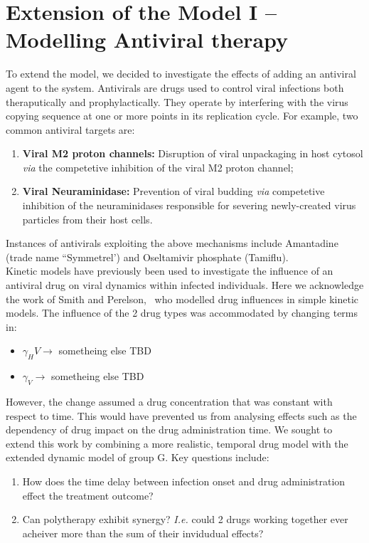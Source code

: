\documentclass[a4paper, 12pt]{report}
\begin{document}
\section{Extension of the Model I -- Modelling Antiviral therapy}

To extend the model, we decided to investigate the effects of adding an antiviral agent to the system.
Antivirals are drugs used to control viral infections both theraputically and prophylactically. They operate by interfering with the virus copying sequence at one or more points in its replication cycle. For example, two common antiviral targets are:
\begin{enumerate}
\item \textbf{Viral M2 proton channels:} Disruption of viral unpackaging in host cytosol \textit{via} the competetive inhibition of the viral M2 proton channel;~\cite{}
\item \textbf{Viral Neuraminidase:} Prevention of viral budding \textit{via} competetive inhibition of the neuraminidases responsible for severing newly-created virus particles from their host cells.\cite{}  
\end{enumerate}
Instances of antivirals exploiting the above mechanisms include  Amantadine (trade name ``Symmetrel') and Oseltamivir phosphate (Tamiflu).\\

Kinetic models have previously been used to investigate the influence of an antiviral drug on viral dynamics within infected individuals. Here we acknowledge the work of Smith and Perelson,~\cite{Smith} who modelled drug influences in simple kinetic models.
The influence of the 2 drug types was accommodated by changing terms in:
\begin{itemize}
\item  $\gamma_HV \rightarrow $ sometheing else TBD
\item $\gamma_V \rightarrow $ sometheing else TBD
\end{itemize}
However, the change assumed a drug concentration that was constant with respect to time. This would have prevented us from analysing effects such as the dependency of drug impact on the drug administration time.
We sought to extend this work by combining a more realistic, temporal drug model with the extended dynamic model of group G. 
Key questions include:
\begin{enumerate}
\item How does the time delay between infection onset and drug administration effect the treatment outcome?
\item Can polytherapy exhibit synergy? \textit{I.e.} could 2 drugs working together ever acheiver more than the sum of their invidudual effects?
\end{enumerate}
\end{document}

